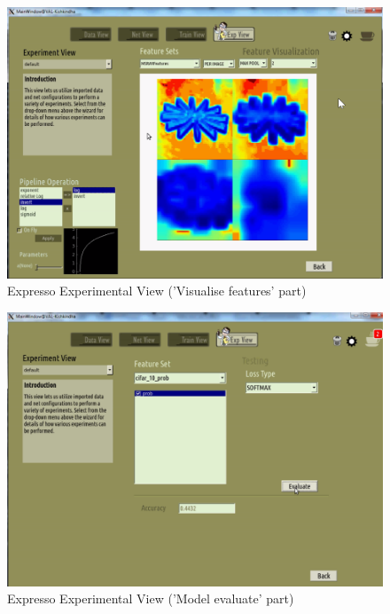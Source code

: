 \begin{figure}[!ht]
\center
    \includegraphics[scale=0.9]{images_expresso/11_exp_visualize.png}
    \caption{Expresso Experimental View ('Visualise features' part)}
\end{figure}

\begin{figure}[!ht]
\center
    \includegraphics[scale=0.9]{images_expresso/12_exp_evaluate.png}
    \caption{Expresso Experimental View ('Model evaluate' part)}
\end{figure}


